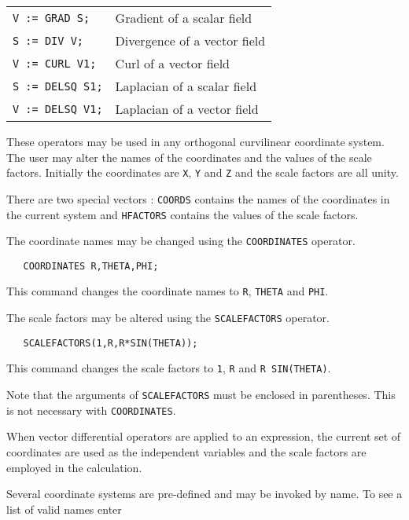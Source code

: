 \documentclass[11pt,letterpaper]{book}
\begin{document}
\begin{tabular}{l l}
{\tt V := GRAD S;} & Gradient of a scalar field \\
{\tt S := DIV V;} & Divergence of a vector field \\
{\tt V := CURL V1;} & Curl of a vector field \\
{\tt S := DELSQ S1;} & Laplacian of a scalar field \\
{\tt V := DELSQ V1;} & Laplacian of a vector field \\
\end{tabular}

These operators may be used in any orthogonal curvilinear coordinate
system. The user may alter the names of the coordinates and the values
of the scale factors. Initially the coordinates are {\tt X}, {\tt Y}
and {\tt Z} and the scale factors are all unity.

There are two special vectors : {\tt COORDS} contains the names
of the coordinates in the current system and {\tt HFACTORS}
contains the values of the scale factors.

The coordinate names may be changed using the {\tt COORDINATES}
operator.

{\small\begin{verbatim}
   COORDINATES R,THETA,PHI;
\end{verbatim}}

This command changes the coordinate names to {\tt R}, {\tt THETA} and
{\tt PHI}.

The scale factors may be altered using the {\tt SCALEFACTORS} operator.

{\small\begin{verbatim}
   SCALEFACTORS(1,R,R*SIN(THETA));
\end{verbatim}}

This command changes the scale factors to {\tt 1}, {\tt R} and {\tt R
SIN(THETA)}.

Note that the arguments of {\tt SCALEFACTORS} must be enclosed in
parentheses. This is not necessary with {\tt COORDINATES}.


When vector differential operators are applied to an expression,
the current set of coordinates are used as the independent
variables and the scale factors are employed in the calculation.


Several coordinate systems are pre-defined and may be invoked by
name. To see a list of valid names enter
\end{document}
